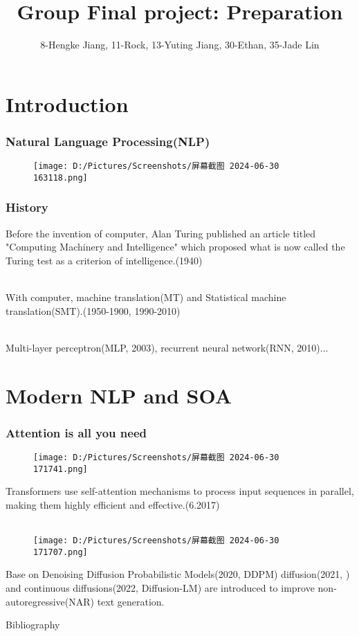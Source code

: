 \documentclass{beamer}
\title[Final project] 
{Group Final project: Preparation}
\author{8-Hengke Jiang, 11-Rock, 13-Yuting Jiang, 30-Ethan, 35-Jade Lin}
\institute[] %
{ 
  {linyh63@mail2.sysu.edu.cn}
}
\date[6.30.2024] %
\begin{document}
\frame{\titlepage}
\section{Introduction}
\begin{frame}
  \frametitle{Natural Language Processing(NLP)}
  
  \begin{figure}[H]
    \centering
    \texttt{[image: D:/Pictures/Screenshots/屏幕截图 2024-06-30 163118.png]}
  \end{figure}
\end{frame}
\begin{frame}
  \frametitle{History}
  Before the invention of computer, Alan Turing published an article titled "Computing Machinery and Intelligence" which proposed what is now called the Turing test as a criterion of intelligence.(1940)\\\

  With computer, machine translation(MT) and Statistical machine translation(SMT).(1950-1900, 1990-2010)\\\

  Multi-layer perceptron(MLP, 2003), recurrent neural network(RNN, 2010)...
\end{frame}
\section{Modern NLP and SOA}
\begin{frame}
  \frametitle{Attention is all you need}
  \begin{figure}[H]
    \centering
    \texttt{[image: D:/Pictures/Screenshots/屏幕截图 2024-06-30 171741.png]}
  \end{figure}
  Transformers use self-attention mechanisms to process input sequences in parallel, making them highly efficient and effective.(6.2017\cite{vaswani2023attentionneed})\\\
  \begin{figure}[H]
    \centering
    \texttt{[image: D:/Pictures/Screenshots/屏幕截图 2024-06-30 171707.png]}
  \end{figure}

  Base on Denoising Diffusion Probabilistic Models(2020, DDPM\cite{ho2020denoisingdiffusionprobabilisticmodels})
  diffusion(2021, \cite{austin2023structureddenoisingdiffusionmodels}) and continuous diffusions(2022, Diffusion-LM\cite{li2022diffusionlmimprovescontrollabletext}) are introduced to improve non-autoregressive(NAR) text generation.

\end{frame}
\begin{frame}{Bibliography}
  
\end{frame}
\end{document}
